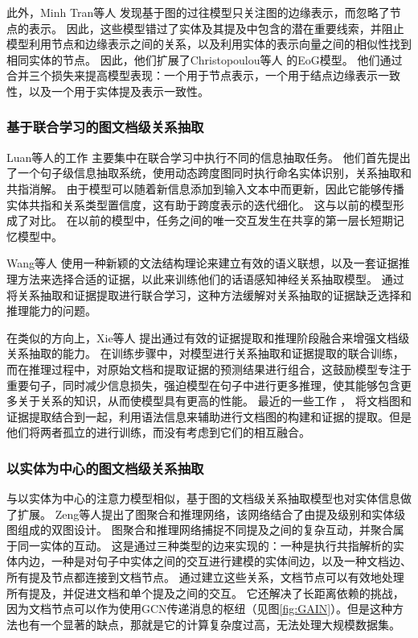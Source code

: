 \documentclass[bachelor]{thesis-uestc}
\begin{document}
此外，Minh Tran等人 \cite{minh-tran-etal-2020-dots}发现基于图的过往模型只关注图的边缘表示，而忽略了节点的表示。
因此，这些模型错过了实体及其提及中包含的潜在重要线索，并阻止模型利用节点和边缘表示之间的关系，以及利用实体的表示向量之间的相似性找到相同实体的节点。
因此，他们扩展了Christopoulou等人 \cite{christopoulou-etal-2019-connecting}的EoG模型。
他们通过合并三个损失来提高模型表现：一个用于节点表示，一个用于结点边缘表示一致性，以及一个用于实体提及表示一致性。\par

\subsubsection{基于联合学习的图文档级关系抽取}\label{subsec:joined-graph}

Luan等人的工作 \cite{luan-etal-2019-general}主要集中在联合学习中执行不同的信息抽取任务。
他们首先提出了一个句子级信息抽取系统，使用动态跨度图同时执行命名实体识别，关系抽取和共指消解。
由于模型可以随着新信息添加到输入文本中而更新，因此它能够传播实体共指和关系类型置信度，这有助于跨度表示的迭代细化。
这与以前的模型形成了对比。
在以前的模型中，任务之间的唯一交互发生在共享的第一层长短期记忆模型中。\par

Wang等人 \cite{WANG2021107274}使用一种新颖的文法结构理论来建立有效的语义联想，以及一套证据推理方法来选择合适的证据，以此来训练他们的话语感知神经关系抽取模型。
通过将关系抽取和证据提取进行联合学习，这种方法缓解对关系抽取的证据缺乏选择和推理能力的问题。\par

在类似的方向上，Xie等人 \cite{xie2022eider}提出通过有效的证据提取和推理阶段融合来增强文档级关系抽取的能力。
在训练步骤中，对模型进行关系抽取和证据提取的联合训练，而在推理过程中，对原始文档和提取证据的预测结果进行组合，这鼓励模型专注于重要句子，同时减少信息损失，强迫模型在句子中进行更多推理，使其能够包含更多关于关系的知识，从而使模型具有更高的性能。
最近的一些工作 \cite{SagDRE, duan-etal-2022-just}， 将文档图和证据提取结合到一起，利用语法信息来辅助进行文档图的构建和证据的提取。但是他们将两者孤立的进行训练，而没有考虑到它们的相互融合。
\par

\subsubsection{以实体为中心的图文档级关系抽取}\label{subsec:entity-centric-graph}

与以实体为中心的注意力模型相似，基于图的文档级关系抽取模型也对实体信息做了扩展。
Zeng等人\cite{GAIN}提出了图聚合和推理网络，该网络结合了由提及级别和实体级图组成的双图设计。
图聚合和推理网络捕捉不同提及之间的复杂互动，并聚合属于同一实体的互动。
这是通过三种类型的边来实现的：一种是执行共指解析的实体内边，一种是对句子中实体之间的交互进行建模的实体间边，以及一种文档边、所有提及节点都连接到文档节点。
通过建立这些关系，文档节点可以有效地处理所有提及，并促进文档和单个提及之间的交互。
它还解决了长距离依赖的挑战，因为文档节点可以作为使用GCN传递消息的枢纽（见图\ref{fig:GAIN}）。但是这种方法也有一个显著的缺点，那就是它的计算复杂度过高，无法处理大规模数据集。\par
\end{document}
